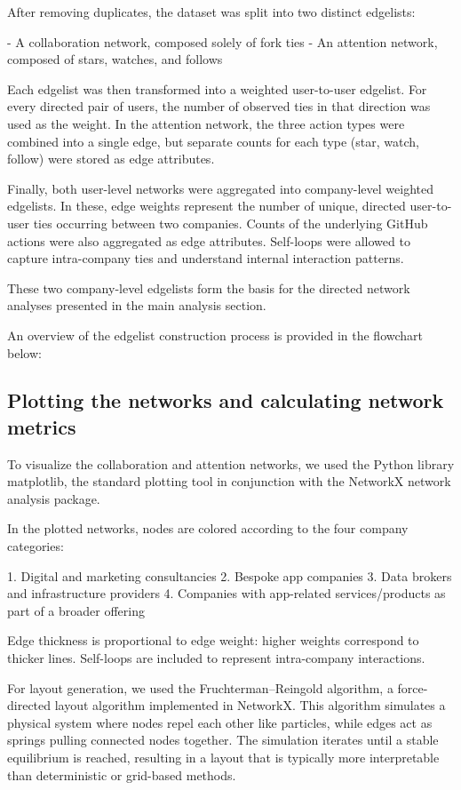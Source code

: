 After removing duplicates, the dataset was split into two distinct edgelists:

- A collaboration network, composed solely of fork ties
- An attention network, composed of stars, watches, and follows

Each edgelist was then transformed into a weighted user-to-user edgelist. For every directed pair of users, the number of observed ties in that direction was used as the weight. In the attention network, the three action types were combined into a single edge, but separate counts for each type (star, watch, follow) were stored as edge attributes.

Finally, both user-level networks were aggregated into company-level weighted edgelists. In these, edge weights represent the number of unique, directed user-to-user ties occurring between two companies. Counts of the underlying GitHub actions were also aggregated as edge attributes. Self-loops were allowed to capture intra-company ties and understand internal interaction patterns.

These two company-level edgelists form the basis for the directed network analyses presented in the main analysis section.

An overview of the edgelist construction process is provided in the flowchart below:

\subsection{Plotting the networks and calculating network metrics}

To visualize the collaboration and attention networks, we used the Python library matplotlib, the standard plotting tool in conjunction with the NetworkX network analysis package.

In the plotted networks, nodes are colored according to the four company categories:

1. Digital and marketing consultancies
2. Bespoke app companies
3. Data brokers and infrastructure providers
4. Companies with app-related services/products as part of a broader offering

Edge thickness is proportional to edge weight: higher weights correspond to thicker lines. Self-loops are included to represent intra-company interactions.

For layout generation, we used the Fruchterman–Reingold algorithm, a force-directed layout algorithm implemented in NetworkX. This algorithm simulates a physical system where nodes repel each other like particles, while edges act as springs pulling connected nodes together. The simulation iterates until a stable equilibrium is reached, resulting in a layout that is typically more interpretable than deterministic or grid-based methods.

